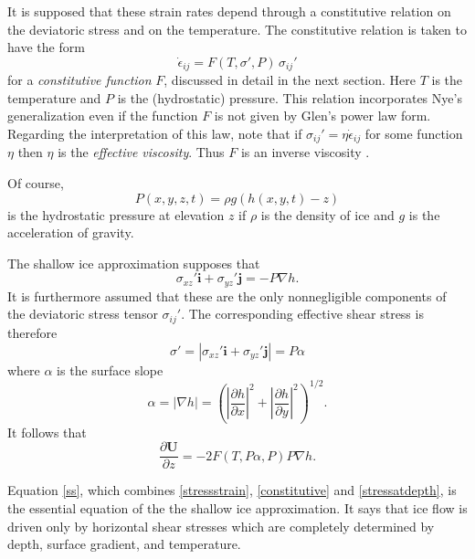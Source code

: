 \documentclass[12pt,final]{amsart}%
\theoremstyle{plain}
\theoremstyle{definition}
\theoremstyle{remark}
\newcommand{\ddx}[1]{\ensuremath{\frac{\partial #1}{\partial x}}}
\newcommand{\ddy}[1]{\ensuremath{\frac{\partial #1}{\partial y}}}
\newcommand{\ddz}[1]{\ensuremath{\frac{\partial #1}{\partial z}}}
\def\eps{\epsilon}
\newcommand{\grad}{\nabla}
\newcommand{\ihat}{\mathbf{i}}
\newcommand{\jhat}{\mathbf{j}}
\newcommand{\bU}{{\mathbf{U}}}
\begin{document}
It is supposed \citep{Fowler,Greve,Hutter93} that these strain rates depend through a constitutive relation on the deviatoric stress and on the temperature.  The constitutive relation is taken to have the form
\begin{equation}\label{constitutive}
\dot\eps_{ij}=F(T,\sigma',P)\,\sigma_{ij}'
\end{equation}
for a \emph{constitutive function} $F$, discussed in detail in the next section.  Here $T$ is the temperature and $P$ is the (hydrostatic) pressure.  This relation incorporates Nye's generalization \citep{Nye} even if the function $F$ is not given by Glen's power law \citep{Glen} form.  Regarding the interpretation of this law, note that if $\sigma_{ij}'=\eta \dot\eps_{ij}$ for some function $\eta$ then $\eta$ is the \emph{effective viscosity}.  Thus $F$ is an inverse viscosity \citep{Fowler}.

Of course,
\begin{equation}\label{pressure}
P(x,y,z,t)=\rho g (h(x,y,t)-z)
\end{equation}
is the hydrostatic pressure at elevation $z$ if $\rho$ is the density of ice and $g$ is the acceleration of gravity.

The shallow ice approximation supposes that
\begin{equation}\label{stressatdepth}
\sigma_{xz}' \ihat + \sigma_{yz}' \jhat = -P\grad h.
\end{equation}
It is furthermore assumed that these are the only nonnegligible components of the deviatoric stress tensor $\sigma_{ij}'$.  The corresponding effective shear stress is therefore
\begin{equation}\label{effstress}
\sigma' = |\sigma_{xz}' \ihat + \sigma_{yz}' \jhat| = P \alpha
\end{equation}
where $\alpha$ is the surface slope
    $$\alpha = |\grad h| = \left(\left|\ddx{h}\right|^2 + \left|\ddy{h}\right|^2\right)^{1/2}.$$
It follows that
\begin{equation}\label{ss}
\ddz{\bU}=-2 F(T,P\alpha,P) P \grad h.
\end{equation}

Equation \eqref{ss}, which combines \eqref{stressstrain}, \eqref{constitutive} and \eqref{stressatdepth}, is the essential equation of the the shallow ice approximation.  It says that ice flow is driven only by horizontal shear stresses which are completely determined by depth, surface gradient, and temperature.
\end{document}
